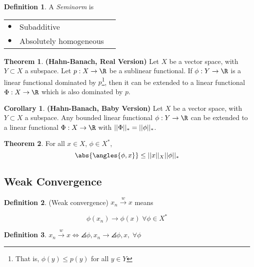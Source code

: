 \documentclass[a5paper]{article}
\theoremstyle{definition}%
\newtheorem*{theorem*}{Theorem} %
\newtheorem*{corollary*}{Corollary}
\newtheorem*{definition*}{Definition}
\numberwithin{exercise}{section}
\theoremstyle{remark}%
\begin{document}
\begin{definition*}
A \emph{Seminorm }is

	\begin{tabular}{lll}
	$\bullet$ &Subadditive \\
	$\bullet$ &Absolutely homogeneous
	\end{tabular}
\end{definition*}

\begin{highlight}
\begin{theorem*}\textbf{(Hahn-Banach, Real Version)}
Let $X$ be a vector space, with $Y\subset X$ a subspace. Let $p:X\to \R$ be a sublinear functional. If $\phi:Y\to\R$ is a linear functional dominated by $p$\footnote{That is, $\phi(y)\leq p(y)$ for all $y\in Y$}, then it can be extended to a linear functional $\Phi:X\to \R$ which is also dominated by $p$.
\end{theorem*}
\end{highlight}

\begin{highlight}
\begin{corollary*}\textbf{(Hahn-Banach, Baby Version)}
Let $X$ be a vector space, with $Y\subset X$ a subspace. Any bounded linear functional $\phi:Y\to\R$ can be extended to a linear functional $\Phi:X\to \R$ with $\norm{\Phi}_*=\norm{\phi}_*$. 
\end{corollary*}
\end{highlight}

\begin{highlight}
\begin{theorem*}
For all $x\in X$, $\phi\in X^*$, 
$$\abs{\angles{\phi,x}}\leq\norm{x}_X\norm{\phi}_*$$
\end{theorem*}
\end{highlight}

\subsection{Weak Convergence}

\begin{definition*}(Weak convergence)
$x_n\xrightarrow{w}x$ means 

$$\phi(x_n)\to \phi	(x) \; \forall\phi\in X^*$$
\end{definition*}

\begin{definition*}
$x_n\xrightarrow{w}x \iff \angles{\phi,x_n} \to \angles{\phi,x,} \;\forall \phi$
\end{definition*}
\end{document}
